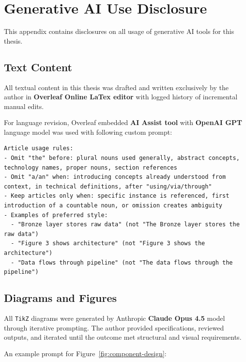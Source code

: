 \chapter{Generative AI Use Disclosure}
\label{app:genai}

This appendix contains disclosures on all usage of generative AI tools for this thesis.

\section{Text Content}

All textual content in this thesis was drafted and written exclusively by the author in \textbf{Overleaf Online LaTex editor} with logged history of incremental manual edits.

For language revision, Overleaf embedded \textbf{AI Assist tool} with \textbf{OpenAI GPT} language model was used with following custom prompt:

\begin{lstlisting}[frame=single, backgroundcolor=\color{backcolour}, rulecolor=\color{framecolour}, basicstyle=\small\ttfamily, breaklines=true]
Article usage rules:
- Omit "the" before: plural nouns used generally, abstract concepts, technology names, proper nouns, section references
- Omit "a/an" when: introducing concepts already understood from context, in technical definitions, after "using/via/through"
- Keep articles only when: specific instance is referenced, first introduction of a countable noun, or omission creates ambiguity
- Examples of preferred style:
  - "Bronze layer stores raw data" (not "The Bronze layer stores the raw data")
  - "Figure 3 shows architecture" (not "Figure 3 shows the architecture")
  - "Data flows through pipeline" (not "The data flows through the pipeline")
\end{lstlisting}

\section{Diagrams and Figures}

All \texttt{TikZ} diagrams were generated by Anthropic \textbf{Claude Opus 4.5} model through iterative prompting. The author provided specifications, reviewed outputs, and iterated until the outcome met structural and visual requirements.

An example prompt for Figure~\ref{fig:component-design}:

